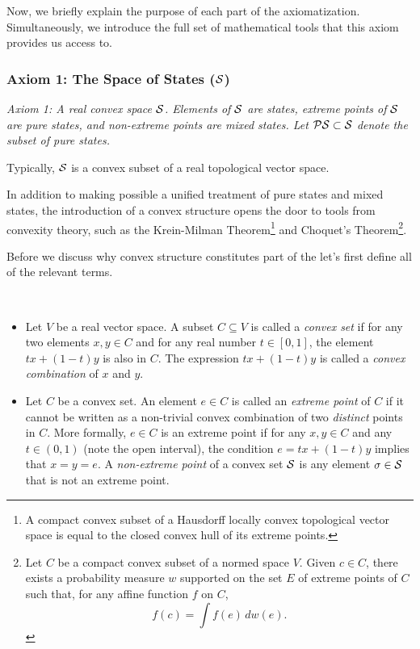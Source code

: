 Now, we briefly explain the purpose of each part of the axiomatization. Simultaneously, we introduce the full set of mathematical tools that this axiom provides us access to.

\subsubsection{Axiom 1: The Space of States ($\mathcal{S}$)}

\textit{Axiom 1: A real convex space $\mathcal{S}$. Elements of $\mathcal{S}$ are states, extreme points of $\mathcal{S}$ are pure states, and non-extreme points are mixed states. Let $\mathcal{PS} \subset \mathcal{S}$ denote the subset of pure states.}

\begin{remark}
Typically, $\mathcal{S}$ is a convex subset of a real topological vector space.
\end{remark}

\begin{remark}
In addition to making possible a unified treatment of pure states and mixed states, the introduction of a convex structure opens the door to tools from convexity theory, such as the Krein-Milman Theorem\footnote{A compact convex subset of a Hausdorff locally convex topological vector space is equal to the closed convex hull of its extreme points.} and Choquet's Theorem\footnote{Let $C$ be a compact convex subset of a normed space $V$. Given $c \in C$, there exists a probability measure $w$ supported on the set $E$ of extreme points of $C$ such that, for any affine function $f$ on $C$,
\[
f(c) = \int f(e) \, dw(e).
\]}.
\end{remark}

Before we discuss why convex structure constitutes part of the  let's first define all of the relevant terms.

\begin{definition}
\,
\begin{itemize}
\item Let $V$ be a real vector space. A subset $C \subseteq V$ is called a \textit{convex set} if for any two elements $x, y \in C$ and for any real number $t \in [0, 1]$, the element $tx + (1-t)y$ is also in $C$. The expression $t x + (1-t)y$ is called a \textit{convex combination} of $x$ and $y$.
\item  Let $C$ be a convex set. An element $e \in C$ is called an \textit{extreme point} of $C$ if it cannot be written as a non-trivial convex combination of two \textit{distinct} points in $C$. More formally, $e \in C$ is an extreme point if for any $x, y \in C$ and any $t \in (0, 1)$ (note the open interval), the condition $e = tx + (1-t)y$ implies that $x = y = e$. A \textit{non-extreme point} of a convex set $\mathcal{S}$ is any element $\sigma \in \mathcal{S}$ that is not an extreme point.
\end{itemize}
\end{definition}

